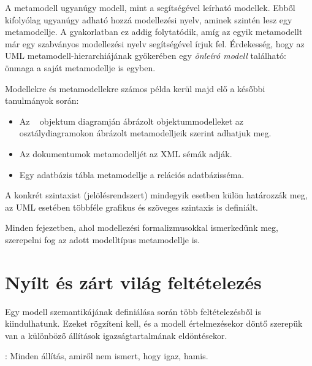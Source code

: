 \begin{megjegyzes}
	A metamodell ugyanúgy modell, mint a segítségével leírható modellek. Ebből kifolyólag ugyanúgy adható hozzá modellezési nyelv, aminek szintén lesz egy metamodellje. A gyakorlatban ez addig folytatódik, amíg az egyik metamodellt már egy szabványos modellezési nyelv segítségével írjuk fel. Érdekesség, hogy az UML metamodell-hierarchiájának gyökerében egy \emph{önleíró modell} található: önmaga a saját metamodellje is egyben.
\end{megjegyzes}

\begin{pelda}
	Modellekre és metamodellekre számos példa kerül majd elő a későbbi tanulmányok során:
	\begin{itemize}
		\item Az ~\cite{UML} objektum diagramján ábrázolt objektummodelleket az osztálydiagramokon ábrázolt metamodelljeik szerint adhatjuk meg.
		\item Az  dokumentumok metamodelljét az XML sémák adják.
		\item Egy adatbázis tábla metamodellje a relációs adatbázisséma.
	\end{itemize}
	A konkrét szintaxist (jelölésrendszert) mindegyik esetben külön határozzák meg, az UML esetében többféle grafikus és szöveges szintaxis is definiált.
\end{pelda}

\begin{tipp}
	Minden fejezetben, ahol modellezési formalizmusokkal ismerkedünk meg, szerepelni fog az adott modelltípus metamodellje is.
\end{tipp}


\section{Nyílt és zárt világ feltételezés} \label{sec:owacwa}

Egy modell szemantikájának definiálása során több feltételezésből is kiindulhatunk. Ezeket rögzíteni kell, és a modell értelmezésekor döntő szerepük van a különböző állítások igazságtartalmának eldöntésekor.

\begin{definicio}
	: Minden állítás, amiről nem ismert, hogy igaz, hamis.
\end{definicio}

